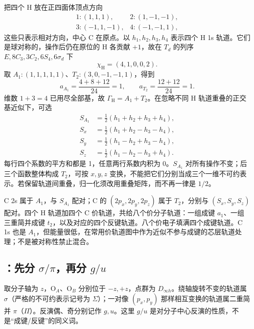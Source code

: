 \begin{worked}
把四个 H 放在正四面体顶点方向
\[
\begin{array}{ll}
1:(1,1,1),&2:(1,-1,-1),\\
3:(-1,1,-1),&4:(-1,-1,1),
\end{array}
\]
这些只表示相对方向，中心 C 在原点。以 $h_1,h_2,h_3,h_4$ 表示四个 H 1s 轨道。它们是球对称的，操作后仍在原位的 H 各贡献 $+1$，故在 $T_d$ 的列序 $E,8C_3,3C_2,6S_4,6\sigma_d$ 下
\[
\chi_{\mathrm H}=(4,1,0,0,2).
\]
取 $A_1:(1,1,1,1,1)$、$T_2:(3,0,-1,-1,1)$，得到
\[
a_{A_1}=\frac{4+8+12}{24}=1,\qquad
a_{T_2}=\frac{12+12}{24}=1.
\]
维数 $1+3=4$ 已用尽全部基，故 $\Gamma_{\mathrm H}=A_1+T_2$。在忽略不同 H 轨道重叠的正交基近似下，可选
\begin{align*}
S_{A_1}&=\tfrac12(h_1+h_2+h_3+h_4),\\
S_x&=\tfrac12(h_1+h_2-h_3-h_4),\\
S_y&=\tfrac12(h_1-h_2+h_3-h_4),\\
S_z&=\tfrac12(h_1-h_2-h_3+h_4).
\end{align*}
每行四个系数的平方和都是 1，任意两行系数内积为 0。$S_{A_1}$ 对所有操作不变；后三个函数整体构成 $T_2$，可按 $x,y,z$ 变换，不能把它们分别当成三个一维不可约表示。若保留轨道间重叠，归一化须改用重叠矩阵，而不再一律是 $1/2$。

C 2s 属于 $A_1$，与 $S_{A_1}$ 配对；C 的 $(2p_x,2p_y,2p_z)$ 属于 $T_2$，分别与 $(S_x,S_y,S_z)$ 配对。四个 H 轨道加四个 C 价轨道，共给八个价分子轨道：一组成键 $a_1$、一组三重简并成键 $t_2$，以及对应的四个反键轨道。八个价电子填满四个成键轨道。C 1s 也是 $A_1$，但能量很低，在常用价轨道图中作为近似不参与成键的芯层轨道处理；不是被对称性禁止混合。
\end{worked}

\subsection{：先分 $\sigma/\pi$，再分 $g/u$}

取分子轴为 $z$，O$_A$、O$_B$ 分别位于 $-z,+z$，点群为 $D_{\infty h}$。绕轴旋转不变的轨道属 $\sigma$（严格的不可约表示记号为 $\Sigma$）；一对像 $(p_x,p_y)$ 那样相互变换的轨道属二重简并 $\pi$（$\Pi$）。反演偶、奇分别记作 $g,u$。这里 $g/u$ 是对分子中心反演的性质，不是“成键/反键”的同义词。

